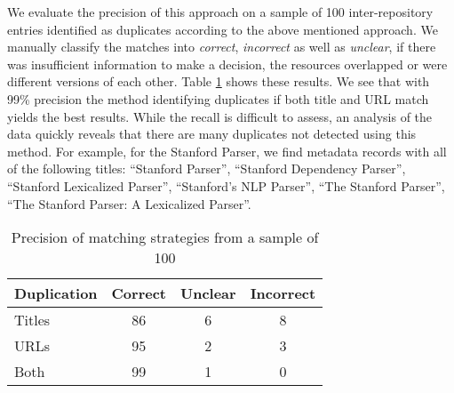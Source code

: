 \documentclass[11pt]{article}
\begin{document}


We evaluate the precision of this approach on a sample of 100 inter-repository entries identified
as duplicates according to the above mentioned approach. We manually classify
the matches into \emph{correct}, \emph{incorrect} as well as \emph{unclear}, if
there was insufficient information to make a decision, the resources overlapped
or were different versions of each other. Table \ref{tab:dupe-precision} shows
these results. We see that with 99\% precision the method identifying duplicates
if both title and URL match yields the best results. While the recall is
difficult to assess, an analysis of the data quickly reveals that there are many
duplicates not detected using this method. For example, for the Stanford Parser,
we find metadata records with all of the following titles: ``Stanford Parser'',
``Stanford Dependency Parser'',  ``Stanford Lexicalized Parser'', ``Stanford's
NLP Parser'', ``The Stanford Parser'', ``The Stanford Parser: A Lexicalized
Parser''.



\begin{table}
    \begin{tabular}{l|ccc}
        Duplication & Correct & Unclear & Incorrect \\
        \hline                    
        Titles      &    86   &   6     &    8      \\ 
        URLs        &    95   &   2     &    3      \\
        Both        &    99   &   1     &    0      \\
    \end{tabular}
    \caption{\label{tab:dupe-precision}Precision of matching strategies from a
    sample of 100}
\end{table}
\end{document}
